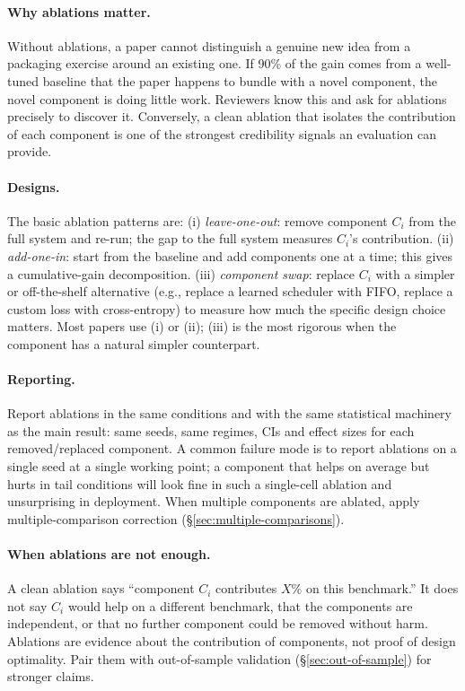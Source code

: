 \documentclass[11pt]{article}
\begin{document}
\paragraph{Why ablations matter.} Without ablations, a paper cannot distinguish a genuine new idea from a packaging exercise around an existing one. If 90\% of the gain comes from a well-tuned baseline that the paper happens to bundle with a novel component, the novel component is doing little work. Reviewers know this and ask for ablations precisely to discover it. Conversely, a clean ablation that isolates the contribution of each component is one of the strongest credibility signals an evaluation can provide.

\paragraph{Designs.} The basic ablation patterns are: (i) \emph{leave-one-out}: remove component $C_i$ from the full system and re-run; the gap to the full system measures $C_i$'s contribution. (ii) \emph{add-one-in}: start from the baseline and add components one at a time; this gives a cumulative-gain decomposition. (iii) \emph{component swap}: replace $C_i$ with a simpler or off-the-shelf alternative (e.g., replace a learned scheduler with FIFO, replace a custom loss with cross-entropy) to measure how much the specific design choice matters. Most papers use (i) or (ii); (iii) is the most rigorous when the component has a natural simpler counterpart.

\paragraph{Reporting.} Report ablations in the same conditions and with the same statistical machinery as the main result: same seeds, same regimes, CIs and effect sizes for each removed/replaced component. A common failure mode is to report ablations on a single seed at a single working point; a component that helps on average but hurts in tail conditions will look fine in such a single-cell ablation and unsurprising in deployment. When multiple components are ablated, apply multiple-comparison correction (\S\ref{sec:multiple-comparisons}).

\paragraph{When ablations are not enough.} A clean ablation says ``component $C_i$ contributes $X\%$ on this benchmark.'' It does not say $C_i$ would help on a different benchmark, that the components are independent, or that no further component could be removed without harm. Ablations are evidence about the contribution of components, not proof of design optimality. Pair them with out-of-sample validation (\S\ref{sec:out-of-sample}) for stronger claims.
\end{document}
